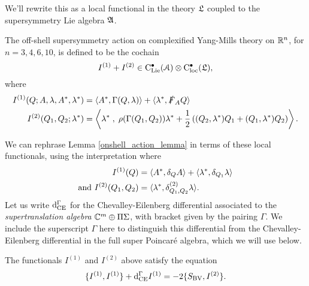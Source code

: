 \documentclass[10pt, oneside]{article}
\begin{document}
We'll rewrite this as a local functional in the theory $\mathfrak L$ coupled to the supersymmetry Lie algebra $\mathfrak{A}$.

\begin{definition}
The off-shell supersymmetry action on complexified Yang-Mills theory on $\mathbb R^{n}$, for $n=3,4,6,10$, is defined to be the cochain
\[I^{(1)} + I^{(2)} \in {\rm C}_{\rm Lie}^\bullet(\mathcal{A}) \otimes {\rm C}_{\rm loc}^\bullet(\mathfrak L),\]
where 
\begin{align*}
I^{(1)} (Q ; A, \lambda, A^*, \lambda^*) & = \langle A^* , \Gamma(Q, \lambda)\rangle + \langle\lambda^*, \slashed{F}_A Q\rangle \\
I^{(2)} (Q_1,Q_2 ; \lambda^*) & =  \left\langle\lambda^* \;,\; \rho(\Gamma(Q_1,Q_2)) \lambda^* + \frac 12 \left((Q_2, \lambda^*)Q_1 + (Q_1, \lambda^*)Q_2\right)\right\rangle .
\end{align*}
\end{definition}

We can rephrase Lemma \ref{onshell_action_lemma} in terms of these local functionals, using the interpretation where 
\begin{align*}
I^{(1)}(Q) &= \langle A^* , \delta_{Q} A\rangle + \langle\lambda^*, \delta_{Q_1} \lambda\rangle \\
\text{and } I^{(2)}(Q_1,Q_2) &= \langle\lambda^*, \delta^{(2)}_{Q_1,Q_2}\lambda\rangle.
\end{align*}
Let us write ${\rm d}_{\mathrm{CE}}^\Gamma$ for the Chevalley-Eilenberg differential associated to the \emph{supertranslation algebra} $\mathbb C^m \oplus \Pi \Sigma$, with bracket given by the pairing $\Gamma$.  We include the superscript $\Gamma$ here to distinguish this differential from the Chevalley-Eilenberg differential in the full super Poincar\'e algebra, which we will use below.

\begin{lemma} \label{onshell_interaction_lemma}
The functionals $I^{(1)}$ and $I^{(2)}$ above satisfy the equation
\[\{I^{(1)},I^{(1)}\} + {\rm d}_{\mathrm{CE}}^\Gamma I^{(1)} = -2\{S_{\mathrm{BV}} , I^{(2)}\}.\]
\end{lemma}
\end{document}

